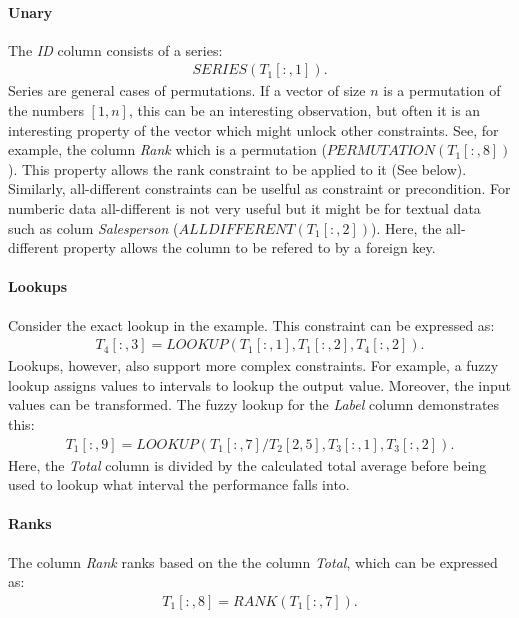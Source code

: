 \documentclass[a4paper]{article}
\newcommand{\range}[3]{#1[#2,#3]}
\newcommand{\rangeall}{:}
\begin{document}
\paragraph{Unary}
The \textit{ID} column consists of a series:
\begin{align}
	\mathit{SERIES}(\range{T_1}{\rangeall}{1}).
\end{align}
Series are general cases of permutations.
If a vector of size $n$ is a permutation of the numbers $[1, n]$, this can be an interesting observation, but often it is an interesting property of the vector which might unlock other constraints.
See, for example, the column \textit{Rank} which is a permutation ($\mathit{PERMUTATION}(\range{T_1}{\rangeall}{8})$).
This property allows the rank constraint to be applied to it (See below).
Similarly, all-different constraints can be uselful as constraint or precondition.
For numberic data all-different is not very useful but it might be for textual data such as colum \textit{Salesperson} ($\mathit{ALLDIFFERENT}(\range{T_1}{\rangeall}{2})$).
Here, the all-different property allows the column to be refered to by a foreign key.

\paragraph{Lookups}
Consider the exact lookup in the example.
This constraint can be expressed as:
\begin{align}
	\range{T_4}{\rangeall}{3} = \mathit{LOOKUP}(\range{T_1}{\rangeall}{1}, \range{T_1}{\rangeall}{2}, \range{T_4}{\rangeall}{2}).
\end{align}
Lookups, however, also support more complex constraints.
For example, a fuzzy lookup assigns values to intervals to lookup the output value.
Moreover, the input values can be transformed.
The fuzzy lookup for the \textit{Label} column demonstrates this:
\begin{align}
	\range{T_1}{\rangeall}{9} = \mathit{LOOKUP}(\range{T_1}{\rangeall}{7} / \range{T_2}{2}{5}, \range{T_3}{\rangeall}{1}, \range{T_3}{\rangeall}{2}).
\end{align}
Here, the \textit{Total} column is divided by the calculated total average before being used to lookup what interval the performance falls into.

\paragraph{Ranks}
The column \textit{Rank} ranks based on the the column \textit{Total}, which can be expressed as:
\begin{align}
	\range{T_1}{\rangeall}{8} = RANK(\range{T_1}{\rangeall}{7}).
\end{align}
\end{document}
